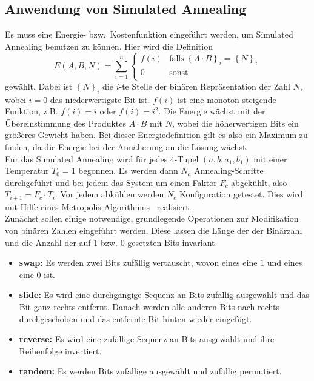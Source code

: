 \subsection{Anwendung von Simulated Annealing}
Es muss eine Energie- bzw.\ Kostenfunktion eingeführt werden, um Simulated Annealing benutzen zu können. Hier wird die Definition
\begin{equation*}
		E\left(A,B,N\right)=\sum\limits_{i=1}^n\begin{cases}
		  		f\left(i\right) & \mathrm{falls}\:{\left\{A\cdot B\right\}}_i={\left\{N\right\}}_i \\
						0 & \mathrm{sonst}\\
				\end{cases}
\end{equation*}
gewählt. Dabei ist ${\left\{N\right\}}_i$ die $i$-te Stelle der binären Repräsentation der Zahl $N$, wobei $i=0$ das niederwertigste Bit ist. $f\left(i\right)$ ist eine monoton steigende Funktion, z.B. $f\left(i\right)=i$ oder $f\left(i\right)=i^2$. Die Energie wächst mit der Übereinstimmung des Produktes $A\cdot B$ mit $N$, wobei die höherwertigen Bits ein größeres Gewicht haben. Bei dieser Energiedefinition gilt es also ein Maximum zu finden, da die Energie bei der Annäherung an die Lösung wächst. \\
Für das Simulated Annealing wird für jedes $4$-Tupel $\left(a,b,a_1,b_1\right)$ mit einer Temperatur $T_0=1$ begonnen. Es werden dann $N_a$ Annealing-Schritte durchgeführt und bei jedem das System um einen Faktor $F_c$ abgekühlt, also $T_{i+1}=F_c\cdot T_i$. Vor jedem abkühlen werden $N_c$ Konfiguration getestet. Dies wird mit Hilfe eines Metropolis-Algorithmus~\parencite{metropolis} realisiert. \\
Zunächst sollen einige notwendige, grundlegende Operationen zur Modifikation von binären Zahlen eingeführt werden. Diese lassen die Länge der der Binärzahl und die Anzahl der auf $1$ bzw. $0$ gesetzten Bits invariant.
\begin{itemize}
		\item \textbf{swap:} Es werden zwei Bits zufällig vertauscht, wovon eines eine $1$ und eines eine $0$ ist.
		\item \textbf{slide:} Es wird eine durchgängige Sequenz an Bits zufällig ausgewählt und das Bit ganz rechts entfernt. Danach werden alle anderen Bits nach rechts durchgeschoben und das entfernte Bit hinten wieder eingefügt.
		\item \textbf{reverse:} Es wird eine zufällige Sequenz an Bits ausgewählt und ihre Reihenfolge invertiert.
		\item \textbf{random:} Es werden Bits zufällige ausgewählt und zufällig permutiert.
\end{itemize}
